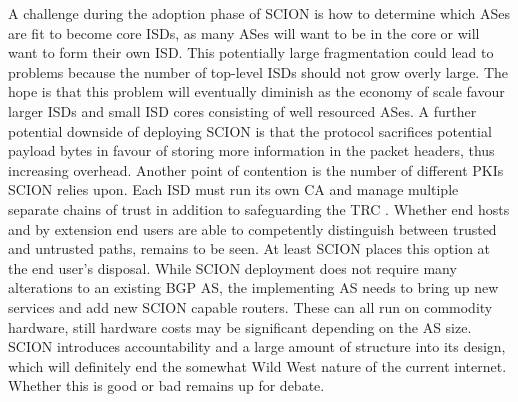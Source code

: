 \documentclass[../eva1_scion.tex]{subfiles}
\begin{document}
  A challenge during the adoption phase of SCION is how to determine which ASes are fit to become core ISDs, as many ASes will want to be in the core or will want to form their own ISD. This potentially large fragmentation could lead to problems because the number of top-level ISDs should not grow overly large. The hope is that this problem will eventually diminish as the economy of scale favour larger ISDs and small ISD cores consisting of well resourced ASes. A further potential downside of deploying SCION is that the protocol sacrifices potential payload bytes in favour of storing more information in the packet headers, thus increasing overhead. Another point of contention is the number of different PKIs SCION relies upon. Each ISD must run its own CA and manage multiple separate chains of trust in addition to safeguarding the TRC \cite{scion_2015}. Whether end hosts and by extension end users are able to competently distinguish between trusted and untrusted paths, remains to be seen. At least SCION places this option at the end user's disposal. While SCION deployment does not require many alterations to an existing BGP AS, the implementing AS needs to bring up new services and add new SCION capable routers. These can all run on commodity hardware, still hardware costs may be significant depending on the AS size.  SCION introduces accountability and a large amount of structure into its design, which will definitely end the somewhat Wild West nature of the current internet. Whether this is good or bad remains up for debate.
\end{document}
